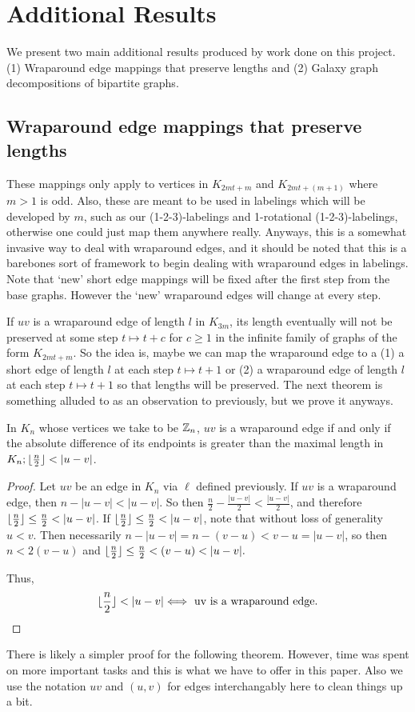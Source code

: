 \chapter{Additional Results} \label{chap:Additional Results}

We present two main additional results produced by work done on this project. (1) Wraparound edge mappings that preserve lengths and (2) Galaxy graph decompositions of bipartite graphs.

\section{Wraparound edge mappings that preserve lengths}

These mappings only apply to vertices in $K_{2mt+m}$ and $K_{2mt+(m+1)}$ where $m>1$ is odd. Also, these are meant to be used in labelings which will be developed by $m$, such as our (1-2-3)-labelings and 1-rotational (1-2-3)-labelings, otherwise one could just map them anywhere really. Anyways, this is a somewhat invasive way to deal with wraparound edges, and it should be noted that this is a barebones sort of framework to begin dealing with wraparound edges in labelings. Note that `new' short edge mappings will be fixed after the first step from the base graphs. However the `new' wraparound edges will change at every step.

If $uv$ is a wraparound edge of length $l$ in $K_{3m}$, its length eventually will not be preserved at some step $t\mapsto t+c$ for $c\geq 1$ in the infinite family of graphs of the form $K_{2mt+m}$. So the idea is, maybe we can map the wraparound edge to a (1) a short edge of length $l$ at each step $t\mapsto t+1$ or (2) a wraparound edge of length $l$ at each step $t\mapsto t+1$ so that lengths will be preserved. The next theorem is something alluded to as an observation to previously, but we prove it anyways.\newpage
\begin{thm} \label{thm:wraplarger}
    In $K_{n}$ whose vertices we take to be $\mathbb{Z}_{n}$, $uv$ is a wraparound edge if and only if the absolute difference of its endpoints is greater than the maximal length in $K_{n};\floor{\frac{n}{2}}<|u-v|$. 
    \begin{proof}
        Let $uv$ be an edge in $K_{n}$ via $\ell$ defined previously. If $uv$ is a wraparound edge, then $n-|u-v|<|u-v|$. So then $\frac{n}{2}-\frac{|u-v|}{2}<\frac{|u-v|}{2}$, and therefore $\floor{\frac{n}{2}}\leq \frac{n}{2}<|u-v|$. If $\floor{\frac{n}{2}}\leq \frac{n}{2}<|u-v|$, note that without loss of generality $u<v$. Then necessarily $n-|u-v|=n-(v-u)<v-u=|u-v|$, so then $n<2(v-u)$ and $\floor{\frac{n}{2}}\leq\frac{n}{2}<(v-u)<|u-v|.$
    
        Thus,
        $$\floor{\frac{n}{2}}<|u-v|\Longleftrightarrow\text{ uv is a wraparound edge.}$$
    \end{proof}
    \end{thm}
There is likely a simpler proof for the following theorem. However, time was spent on more important tasks and this is what we have to offer in this paper. Also we use the notation $uv$ and $(u,v)$ for edges interchangably here to clean things up a bit.

